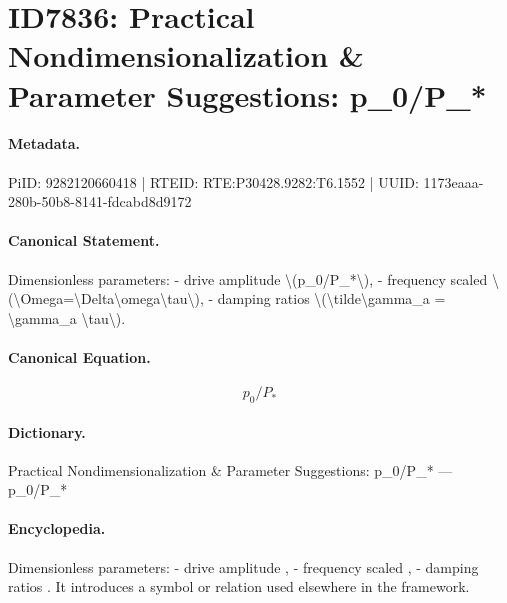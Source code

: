 \section*{ID7836: Practical Nondimensionalization \& Parameter Suggestions: p\_0/P\_*}
\paragraph{Metadata.}
PiID: 9282120660418 | RTEID: RTE:P30428.9282:T6.1552 | UUID: 1173eaaa-280b-50b8-8141-fdcabd8d9172

\paragraph{Canonical Statement.}
Dimensionless parameters: - drive amplitude \textbackslash{}(p\_0/P\_*\textbackslash{}), - frequency scaled \textbackslash{}(\textbackslash{}Omega=\textbackslash{}Delta\textbackslash{}omega\textbackslash{}tau\textbackslash{}), - damping ratios \textbackslash{}(\textbackslash{}tilde\textbackslash{}gamma\_a = \textbackslash{}gamma\_a \textbackslash{}tau\textbackslash{}).

\paragraph{Canonical Equation.}
\[
p_0/P_*
\]

\paragraph{Dictionary.}
Practical Nondimensionalization \& Parameter Suggestions: p\_0/P\_* — p\_0/P\_*

\paragraph{Encyclopedia.}
Dimensionless parameters: - drive amplitude , - frequency scaled , - damping ratios . It introduces a symbol or relation used elsewhere in the framework.
